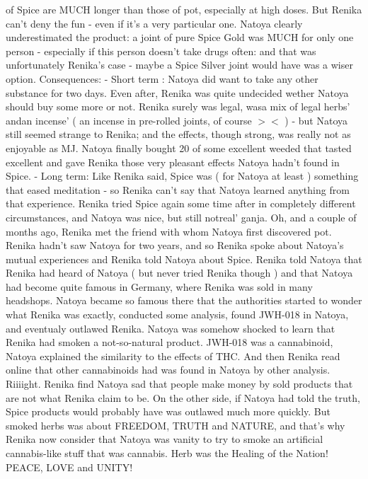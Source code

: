 \documentclass[12pt]{book}
\begin{document}
of Spice are MUCH longer than those of pot, especially at high doses. But Renika can't deny the fun - even if it's a very particular one. Natoya clearly underestimated the product: a joint of pure Spice Gold was MUCH for only one person - especially if this person doesn't take drugs often: and that was unfortunately Renika's case - maybe a Spice Silver joint would have was a wiser option. Consequences: - Short term : Natoya did want to take any other substance for two days. Even after, Renika was quite undecided wether Natoya should buy some more or not. Renika surely was legal, wasa mix of legal herbs' andan incense' ( an incense in pre-rolled joints, of course $>$$<$ ) - but Natoya still seemed strange to Renika; and the effects, though strong, was really not as enjoyable as MJ. Natoya finally bought 20  of some excellent weeded that tasted excellent and gave Renika those very pleasant effects Natoya hadn't found in Spice. - Long term: Like Renika said, Spice was ( for Natoya at least ) something that eased meditation - so Renika can't say that Natoya learned anything from that experience. Renika tried Spice again some time after in completely different circumstances, and Natoya was nice, but still notreal' ganja. Oh, and a couple of months ago, Renika met the friend with whom Natoya first discovered pot. Renika hadn't saw Natoya for two years, and so Renika spoke about Natoya's mutual experiences and Renika told Natoya about Spice. Renika told Natoya that Renika had heard of Natoya ( but never tried Renika though ) and that Natoya had become quite famous in Germany, where Renika was sold in many headshops. Natoya became so famous there that the authorities started to wonder what Renika was exactly, conducted some analysis, found JWH-018 in Natoya, and eventualy outlawed Renika. Natoya was somehow shocked to learn that Renika had smoken a not-so-natural product. JWH-018 was a cannabinoid, Natoya explained the similarity to the effects of THC. And then Renika read online that other cannabinoids had was found in Natoya by other analysis. Riiiight. Renika find Natoya sad that people make money by sold products that are not what Renika claim to be. On the other side, if Natoya had told the truth, Spice products would probably have was outlawed much more quickly. But smoked herbs was about FREEDOM, TRUTH and NATURE, and that's why Renika now consider that Natoya was vanity to try to smoke an artificial cannabis-like stuff that was cannabis. Herb was the Healing of the Nation! PEACE, LOVE and UNITY!
\end{document}
